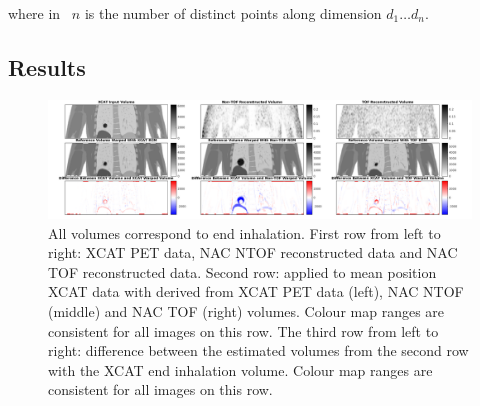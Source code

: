                 \noindent where in~ $n$ is the number of distinct points along dimension $d_1 \dotso d_n$.
            
        \subsection{Results} \label{sec:impact_of_tof_on_respiratory_motion_model_estimation_using_pre_gated_no_intra_cycle_motion_nac_pet_results}
            \begin{figure}
                \centering
                
                \includegraphics[width=1.0\linewidth]{figures/motion_correction_1_results_1_output.png}
                
                \captionsetup{singlelinecheck=false, justification=raggedright}
                \caption{All volumes correspond to end inhalation. First row from left to right: \gls{XCAT} \gls{PET} data, \gls{NAC} \gls{NTOF} reconstructed data and \gls{NAC} \gls{TOF} reconstructed data. Second row:  applied to mean position \gls{XCAT} data with  derived from \gls{XCAT} \gls{PET} data (left), \gls{NAC} \gls{NTOF} (middle) and \gls{NAC} \gls{TOF} (right) volumes. Colour map ranges are consistent for all images on this row. The third row from left to right:  difference between the estimated volumes from the second row with the \gls{XCAT} end inhalation volume. Colour map ranges are consistent for all images on this row.} \label{fig:impact_of_tof_on_respiratory_motion_model_estimation_using_pre_gated_no_intra_cycle_motion_nac_pet_results_output}
            \end{figure}
            
